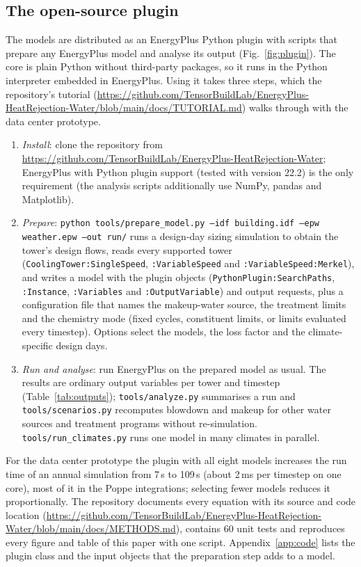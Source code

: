 \documentclass[preprint,12pt]{elsarticle}
\begin{document}
\subsection{The open-source plugin}\label{sec:tool}
The models are distributed as an EnergyPlus Python plugin with scripts that prepare any EnergyPlus model and analyse
its output (Fig.~\ref{fig:plugin}). The core is plain Python without third-party packages, so it runs in the Python
interpreter embedded in EnergyPlus. Using it takes three steps, which the repository's tutorial (\url{https://github.com/TensorBuildLab/EnergyPlus-HeatRejection-Water/blob/main/docs/TUTORIAL.md})
walks through with the data center prototype.
\begin{enumerate}
\item \emph{Install}: clone the repository from \url{https://github.com/TensorBuildLab/EnergyPlus-HeatRejection-Water}; EnergyPlus with Python plugin support (tested with version 22.2) is the only
requirement (the analysis scripts additionally use NumPy, pandas and Matplotlib).
\item \emph{Prepare}: \texttt{python tools/prepare\_model.py --idf building.idf --epw weather.epw --out run/} runs a
design-day sizing simulation to obtain the tower's design flows, reads every supported tower
(\texttt{CoolingTower:SingleSpeed}, \texttt{:VariableSpeed} and \texttt{:VariableSpeed:Merkel}), and writes a model with
the plugin objects (\texttt{PythonPlugin:SearchPaths}, \texttt{:Instance}, \texttt{:Variables} and
\texttt{:OutputVariable}) and output requests, plus a configuration file that names the makeup-water source, the treatment
limits and the chemistry mode (fixed cycles, constituent limits, or limits evaluated every timestep). Options select the
models, the loss factor and the climate-specific design days.
\item \emph{Run and analyse}: run EnergyPlus on the prepared model as usual. The results are ordinary output variables
per tower and timestep (Table~\ref{tab:outputs}); \texttt{tools/analyze.py} summarises a run and
\texttt{tools/scenarios.py} recomputes blowdown and makeup for other water sources and treatment programs without
re-simulation. \texttt{tools/run\_climates.py} runs one model in many climates in parallel.
\end{enumerate}
For the data center prototype the plugin with all eight models increases the run time of an annual simulation from 7\,s
to 109\,s (about 2\,ms per timestep on one core), most of it in the Poppe integrations; selecting fewer models reduces it
proportionally. The repository documents every equation with its source and code location (\url{https://github.com/TensorBuildLab/EnergyPlus-HeatRejection-Water/blob/main/docs/METHODS.md}),
contains 60 unit tests and reproduces every figure and table of this paper with one script. Appendix~\ref{app:code}
lists the plugin class and the input objects that the preparation step adds to a model.
\end{document}
